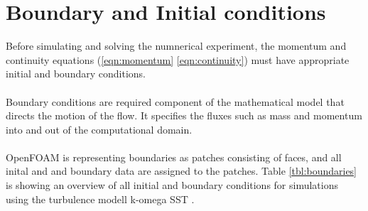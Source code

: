 \documentclass[a4paper, 12pt]{report}
\begin{document}
\section{Boundary and Initial conditions}
Before simulating and solving the numnerical experiment, the momentum and continuity equations (\ref{eqn:momentum} \ref{eqn:continuity}) must have appropriate initial and boundary conditions.\\
\\
Boundary conditions are required component of the mathematical model that directs the motion of the flow. It specifies the fluxes such as mass and momentum into and out of the computational domain.\\
\\
OpenFOAM is representing boundaries as patches consisting of faces, and all inital and and boundary data are assigned to the patches. Table \ref{tbl:boundaries} is showing an overview of all initial and boundary conditions for simulations using the turbulence modell k-omega SST .\\
\\
\end{document}
